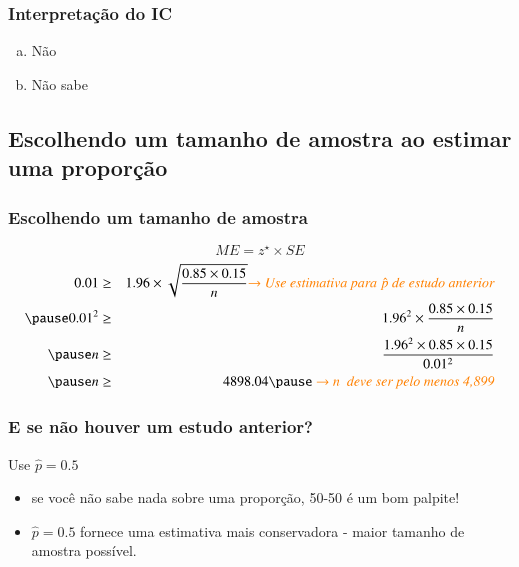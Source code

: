 
\begin{frame}
\frametitle{Interpretação do IC}


\begin{enumerate}[(a)]
\item Não
\item Não sabe
\end{enumerate}

\end{frame}


\subsection{Escolhendo um tamanho de amostra ao estimar uma proporção}


\begin{frame}
\frametitle{Escolhendo um tamanho de amostra}

\pause
\[ ME = z^\star \times SE\]
\pause
{}
\begin{eqnarray*}
0.01 &\ge& 1.96 \times \sqrt{\frac{0.85 \times 0.15}{n}} \orange{$\rightarrow$ \text{Use estimativa para $\hat{p}$ de estudo anterior}} \\
\pause
0.01^2 &\ge& 1.96^2 \times \frac{0.85 \times 0.15}{n} \\
\pause
n &\ge& \frac{1.96^2 \times 0.85 \times 0.15}{0.01^2} \\
\pause
n &\ge& 4898.04 \pause \orange{~$\rightarrow$ n \text{ deve ser pelo menos 4,899}}
\end{eqnarray*}

\end{frame}


\begin{frame}
\frametitle{E se não houver um estudo anterior?}

Use $\hat{p} = 0.5$

\vspace{1cm}

\pause

\begin{itemize}
\item se você não sabe nada sobre uma proporção, 50-50 é um bom palpite!
\pause
\item $\hat{p} = 0.5$ fornece uma estimativa mais conservadora - maior tamanho de amostra possível.
\end{itemize}

\end{frame}

